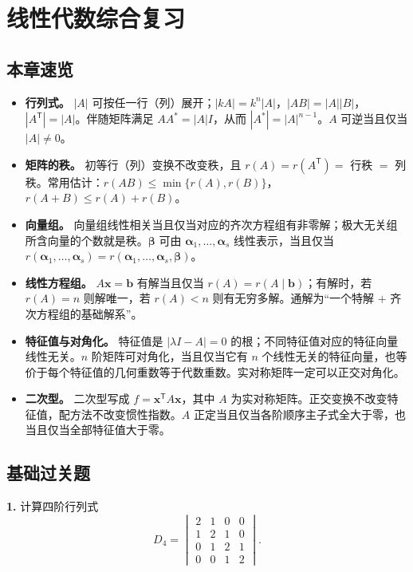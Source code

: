\newpage

\section{线性代数综合复习}

\subsection{本章速览}

\begin{itemize}
  \item \textbf{行列式。} \(|A|\) 可按任一行（列）展开；\(|kA|=k^n|A|\)，\(|AB|=|A||B|\)，\(|A^{\mathsf T}|=|A|\)。伴随矩阵满足 \(AA^*=|A|I\)，从而 \(|A^*|=|A|^{n-1}\)。\(A\) 可逆当且仅当 \(|A|\ne0\)。
  \item \textbf{矩阵的秩。} 初等行（列）变换不改变秩，且 \(r(A)=r(A^{\mathsf T})=\) 行秩 \(=\) 列秩。常用估计：\(r(AB)\le\min\{r(A),r(B)\}\)，\(r(A+B)\le r(A)+r(B)\)。
  \item \textbf{向量组。} 向量组线性相关当且仅当对应的齐次方程组有非零解；极大无关组所含向量的个数就是秩。\(\boldsymbol{\beta}\) 可由 \(\boldsymbol{\alpha}_1,\dots,\boldsymbol{\alpha}_s\) 线性表示，当且仅当 \(r(\boldsymbol{\alpha}_1,\dots,\boldsymbol{\alpha}_s)=r(\boldsymbol{\alpha}_1,\dots,\boldsymbol{\alpha}_s,\boldsymbol{\beta})\)。
  \item \textbf{线性方程组。} \(A\boldsymbol{x}=\boldsymbol{b}\) 有解当且仅当 \(r(A)=r(A\mid\boldsymbol{b})\)；有解时，若 \(r(A)=n\) 则解唯一，若 \(r(A)<n\) 则有无穷多解。通解为“一个特解 \(+\) 齐次方程组的基础解系”。
  \item \textbf{特征值与对角化。} 特征值是 \(|\lambda I-A|=0\) 的根；不同特征值对应的特征向量线性无关。\(n\) 阶矩阵可对角化，当且仅当它有 \(n\) 个线性无关的特征向量，也等价于每个特征值的几何重数等于代数重数。实对称矩阵一定可以正交对角化。
  \item \textbf{二次型。} 二次型写成 \(f=\boldsymbol{x}^{\mathsf T}A\boldsymbol{x}\)，其中 \(A\) 为实对称矩阵。正交变换不改变特征值，配方法不改变惯性指数。\(A\) 正定当且仅当各阶顺序主子式全大于零，也当且仅当全部特征值大于零。
\end{itemize}

\subsection{基础过关题}

\textbf{1.} 计算四阶行列式
\[
D_4=\begin{vmatrix}
2&1&0&0\\
1&2&1&0\\
0&1&2&1\\
0&0&1&2
\end{vmatrix}.
\]

